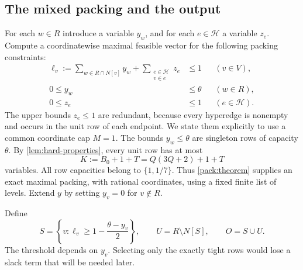 \documentclass[11pt,a4paper]{article}
\theoremstyle{definition}
\theoremstyle{remark}
\newcommand{\HH}{\mathcal H}
\begin{document}
\subsection{The mixed packing and the output}

For each \(w\in R\) introduce a variable \(y_w\), and for each
\(e\in\HH\) a variable \(z_e\). Compute a coordinatewise maximal feasible
vector for the following packing constraints:
\begin{align}
  \ell_v
  :=\sum_{w\in R\cap N[v]}y_w+
     \sum_{\substack{e\in\HH\\v\in e}}z_e
  &\leq 1 &&(v\in V),\label{eq:packing}\\
  0\leq y_w&\leq\theta &&(w\in R),\nonumber\\
  0\leq z_e&\leq1 &&(e\in\HH).\nonumber
\end{align}
The upper bounds \(z_e\leq1\) are redundant, because every hyperedge is
nonempty and occurs in the unit row of each endpoint. We state them
explicitly to use a common coordinate cap \(M=1\). The bounds
\(y_w\leq\theta\) are singleton rows of capacity \(\theta\).
By \cref{lem:hard-properties}, every unit row has at most
\[
  K:=B_0+1+T=Q(3Q+2)+1+T
\]
variables. All row capacities belong to \(\{1,1/7\}\).
Thus \cref{pack:theorem} supplies an exact maximal packing, with rational
coordinates, using a fixed finite list of levels.
Extend \(y\) by setting \(y_v=0\) for \(v\notin R\).

Define
\begin{equation}\label{eq:output}
  S=\left\{v:\ell_v\geq
     1-\frac{\theta-y_v}{2}\right\},
  \qquad
  U=R\setminus N[S],
  \qquad
  O=S\cup U.
\end{equation}
The threshold depends on \(y_v\). Selecting only the exactly tight rows
would lose a slack term that will be needed later.
\end{document}
